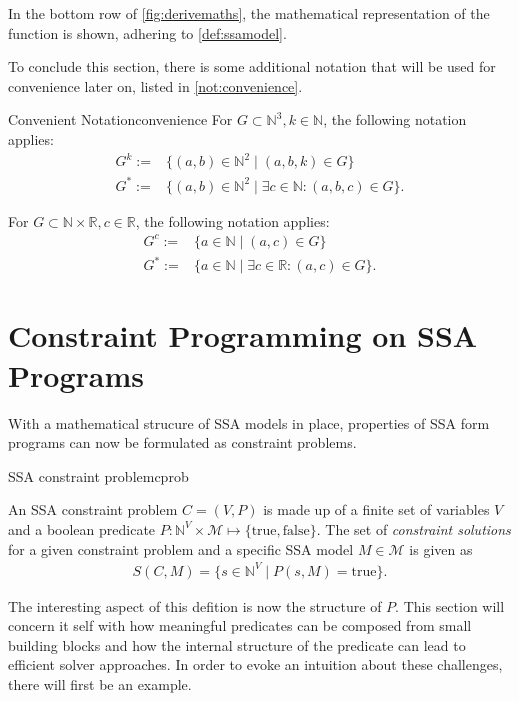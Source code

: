     In the bottom row of \autoref{fig:derivemaths}, the mathematical
    representation of the function is shown, adhering to \autoref{def:ssamodel}.

    To conclude this section, there is some additional notation that will be
    used for convenience later on, listed in \autoref{not:convenience}.

\begin{notation}{Convenient Notation}{convenience}
    For $G\subset\mathbb N^3, k\in\mathbb N$, the following notation applies:
    \begin{align*}
        G^k:=&\{(a,b)\in\mathbb N^2\mid (a,b,k)\in G\}\\
        G^*:=&\{(a,b)\in\mathbb N^2\mid \exists c\in\mathbb N:(a,b,c)\in G\}.
    \end{align*}

    For $G\subset\mathbb N\times\mathbb R, c\in\mathbb R$, the following
    notation applies:
    \begin{align*}
        G^c:=&\{a\in\mathbb N\mid (a,c)\in G\}\\
        G^*:=&\{a\in\mathbb N\mid \exists c\in\mathbb R:(a,c)\in G\}.
    \end{align*}
\end{notation}

\section{Constraint Programming on SSA Programs}

    With a mathematical strucure of SSA models in place, properties of SSA form
    programs can now be formulated as constraint problems.

\begin{definition}{SSA constraint problem}{cprob}

    An SSA constraint problem $C=(V,P)$ is made up of a finite set of variables
    $V$ and a boolean predicate
    $P\colon\mathbb N^V\times\mathcal M\mapsto\{\text{true}, \text{false}\}$.
    The set of {\em constraint solutions} for a given constraint problem and a
    specific SSA model $M\in\mathcal M$ is given as
    \begin{align*}
        S(C,M) = \{s\in\mathbb N^V\mid P(s,M)=\text{true}\}.
    \end{align*}
\end{definition}

    The interesting aspect of this defition is now the structure of $P$.
    This section will concern it self with how meaningful predicates can be
    composed from small building blocks and how the internal structure of the
    predicate can lead to efficient solver approaches.
    In order to evoke an intuition about these challenges, there will first be
    an example.

